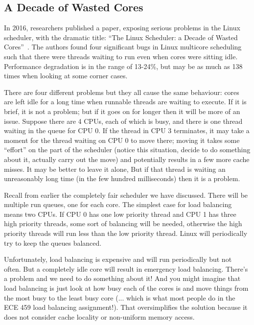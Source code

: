 \subsection*{A Decade of Wasted Cores}

In 2016, researchers published a paper, exposing serious problems in the Linux scheduler, with the dramatic title: ``The Linux Scheduler: a Decade of Wasted Cores''~\cite{wastedcores}. The authors found four significant bugs in Linux multicore scheduling such that there were threads waiting to run even when cores were sitting idle. Performance degradation is in the range of 13-24\%, but may be as much as 138 times when looking at some corner cases. 

There are four different problems but they all cause the same behaviour: cores are left idle for a long time when runnable threads are waiting to execute. If it is brief, it is not a problem; but if it goes on for longer then it will be more of an issue. Suppose there are 4 CPUs, each of which is busy, and there is one thread waiting in the queue for CPU 0. If the thread in CPU 3 terminates, it may take a moment for the thread waiting on CPU 0 to move there; moving it takes some ``effort'' on the part of the scheduler (notice this situation, decide to do something about it, actually carry out the move) and potentially results in a few more cache misses. It may be better to leave it alone, But if that thread is waiting an unreasonably long time (in the few hundred milliseconds) then it is a problem.

Recall from earlier the completely fair scheduler we have discussed. There will be multiple run queues, one for each core. The simplest case for load balancing means two CPUs. If CPU 0 has one low priority thread and CPU 1 has three high priority threads, some sort of balancing will be needed, otherwise the high priority threads will run less than the low priority thread. Linux will periodically try to keep the queues balanced.

Unfortunately, load balancing is expensive and will run periodically but not often. But a completely idle core will result in emergency load balancing. There's a problem and we need to do something about it! And you might imagine that load balancing is just look at how busy each of the cores is and move things from the most busy to the least busy core (... which is what most people do in the ECE 459 load balancing assignment!). That oversimplifies the solution because it does not consider cache locality or non-uniform memory access.

